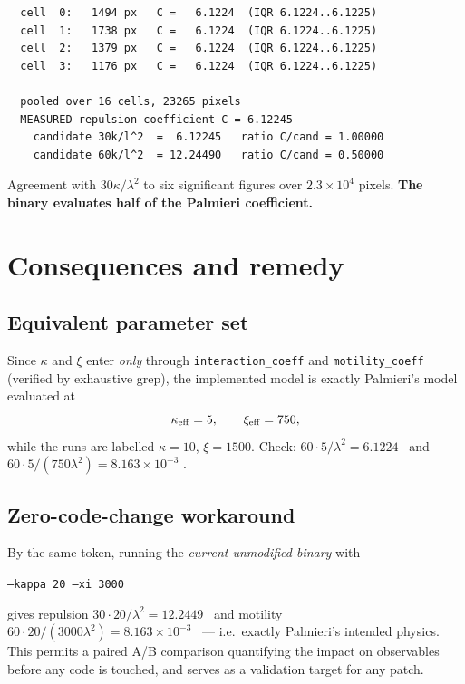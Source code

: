 \documentclass[11pt]{article}
\begin{document}
\begin{lstlisting}
  cell  0:   1494 px   C =   6.1224  (IQR 6.1224..6.1225)
  cell  1:   1738 px   C =   6.1224  (IQR 6.1224..6.1225)
  cell  2:   1379 px   C =   6.1224  (IQR 6.1224..6.1225)
  cell  3:   1176 px   C =   6.1224  (IQR 6.1224..6.1225)

  pooled over 16 cells, 23265 pixels
  MEASURED repulsion coefficient C = 6.12245
    candidate 30k/l^2  =  6.12245   ratio C/cand = 1.00000
    candidate 60k/l^2  = 12.24490   ratio C/cand = 0.50000
\end{lstlisting}

\noindent
Agreement with $30\kappa/\lambda^2$ to six significant figures over
$2.3\times10^4$ pixels. \textbf{The binary evaluates half of the
Palmieri coefficient.}

\section{Consequences and remedy}

\subsection{Equivalent parameter set}

Since $\kappa$ and $\xi$ enter \emph{only} through \texttt{interaction\_coeff}
and \texttt{motility\_coeff} (verified by exhaustive grep), the implemented
model is exactly Palmieri's model evaluated at
\begin{equation}
\kappa_{\rm eff} = 5, \qquad \xi_{\rm eff} = 750,
\end{equation}
while the runs are labelled $\kappa=10$, $\xi=1500$. Check:
$60\cdot5/\lambda^2 = 6.1224$ \checkmark\ and
$60\cdot5/(750\lambda^2) = 8.163\times10^{-3}$ \checkmark.

\subsection{Zero-code-change workaround}

By the same token, running the \emph{current unmodified binary} with
\begin{center}
\texttt{--kappa 20 --xi 3000}
\end{center}
gives repulsion $30\cdot20/\lambda^2 = 12.2449$ \checkmark\ and motility
$60\cdot20/(3000\lambda^2) = 8.163\times10^{-3}$ \checkmark\ --- i.e.\ exactly
Palmieri's intended physics. This permits a paired A/B comparison quantifying
the impact on observables before any code is touched, and serves as a
validation target for any patch.
\end{document}
